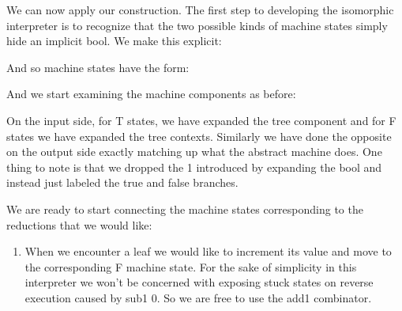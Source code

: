 \documentclass{llncs}
\begin{document}
{\begin{center}
\end{center}

We can now apply our construction. The first step to developing the
isomorphic interpreter is to recognize that the two possible kinds of machine
states simply hide an implicit {{bool}}. We make this explicit:


And so machine states have the form:


And we start examining the machine components as before:

\begin{center}
\end{center}

On the input side, for {{T}} states, we have expanded the tree component and
for {{F}} states we have expanded the tree contexts. Similarly we have done
the opposite on the output side exactly matching up what the abstract machine
does. One thing to note is that we dropped the {{1}} introduced by expanding
the {{bool}} and instead just labeled the {{true}} and {{false}} branches.

We are ready to start connecting the machine states corresponding to
the reductions that we would like:
\begin{enumerate}
\item When we encounter a leaf we would like to increment its value and move
  to the corresponding {{F}} machine state. For the sake of simplicity in
  this interpreter we won't be concerned with exposing stuck states on
  reverse execution caused by {{sub1 0}}. So we are free to use the {{add1}}
  combinator.


\end{enumerate}}
\end{document}
